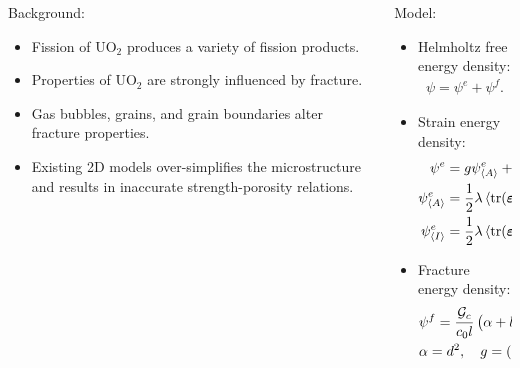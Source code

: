 \begin{frame}
\begin{columns}[T]
\begin{column}{0.5\textwidth}
      Background:
      \begin{itemize}
        \item Fission of UO$_2$ produces a variety of fission products.
        \item Properties of UO$_2$ are strongly influenced by fracture.
        \item Gas bubbles, grains, and grain boundaries alter fracture properties.
        \item Existing 2D models over-simplifies the microstructure and results in inaccurate strength-porosity relations.
      \end{itemize}
    \end{column}
    \begin{column}{0.5\textwidth}
      Model:
      \begin{itemize}
        \item Helmholtz free energy density:
              \begin{align*}
                \psi = \psi^e + \psi^f.
              \end{align*}
        \item Strain energy density:
              \begin{align*}
                \psi^e               & = g \psi^e_{\left< A \right>} + \psi^e_{\left< I \right>},                              \\
                \psi^e_{\left< A \right>}   & = \dfrac{1}{2} \lambda \left<\operatorname{tr}(\boldsymbol{\varepsilon})\right>_+^2 + G \boldsymbol{\varepsilon}^+:\boldsymbol{\varepsilon}^+, \\
                \psi^e_{\left< I \right>} & = \dfrac{1}{2} \lambda \left<\operatorname{tr}(\boldsymbol{\varepsilon})\right>_-^2 + G \boldsymbol{\varepsilon}^-:\boldsymbol{\varepsilon}^-, 
              \end{align*}
        \item Fracture energy density:
              \begin{align*}
                 & \psi^f = \dfrac{{\mathcal{G}_c}}{c_0 l}\left( \alpha + l^2 \boldsymbol{\nabla} d \cdot \boldsymbol{\nabla} d \right), \\
                 & \alpha = d^2, \quad g = (1-d)^2.                                              
              \end{align*}
      \end{itemize}
    \end{column}
  \end{columns}
\end{frame}

